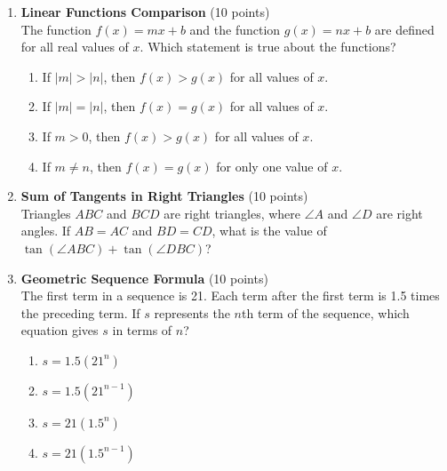 \begin{enumerate}
  \item \textbf{Linear Functions Comparison} (10 points)\\
  The function $f(x)=mx+b$ and the function $g(x)=nx+b$ are defined for all real values of $x$. Which statement is true about the functions?
  \begin{enumerate}[label=(\Alph*)]
    \item If $|m|>|n|$, then $f(x)>g(x)$ for all values of $x$.
    \item If $|m|=|n|$, then $f(x)=g(x)$ for all values of $x$.
    \item If $m>0$, then $f(x)>g(x)$ for all values of $x$.
    \item If $m\neq n$, then $f(x)=g(x)$ for only one value of $x$.
  \end{enumerate}
  \begin{subanswer}
  \end{subanswer}

  \item \textbf{Sum of Tangents in Right Triangles} (10 points)\\
  Triangles $ABC$ and $BCD$ are right triangles, where $\angle A$ and $\angle D$ are right angles. If $AB=AC$ and $BD=CD$, what is the value of $\tan(\angle ABC)+\tan(\angle DBC)$?
  \begin{subanswer}
  \end{subanswer}


  \newpage



  \item \textbf{Geometric Sequence Formula} (10 points)\\
  The first term in a sequence is 21. Each term after the first term is 1.5 times the preceding term. If $s$ represents the $n$th term of the sequence, which equation gives $s$ in terms of $n$?
  \begin{enumerate}[label=(\Alph*)]
    \item $s=1.5\left(21^n\right)$
    \item $s=1.5\left(21^{n-1}\right)$
    \item $s=21\left(1.5^n\right)$
    \item $s=21\left(1.5^{n-1}\right)$
  \end{enumerate}
  \begin{subanswer}
  \end{subanswer}


\end{enumerate}
